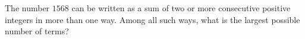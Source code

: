 The number \(1568\) can be written as a sum of two or more consecutive positive integers in more than one way. Among all such ways, what is the largest possible number of terms?
